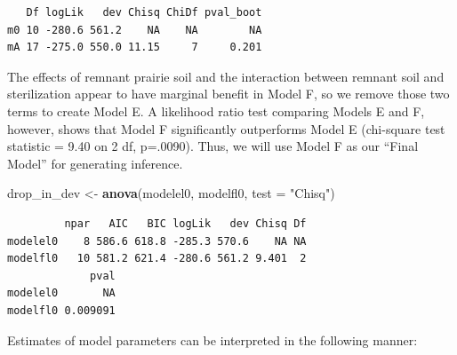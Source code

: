 \documentclass[
]{krantz}
\newenvironment{Shaded}{\begin{snugshade}}{\end{snugshade}}
\newcommand{\DataTypeTok}[1]{\textcolor[rgb]{0.27,0.27,0.27}{#1}}
\newcommand{\KeywordTok}[1]{\textcolor[rgb]{0.27,0.27,0.27}{\textbf{#1}}}
\newcommand{\NormalTok}[1]{#1}
\newcommand{\StringTok}[1]{\textcolor[rgb]{0.5,0.5,0.5}{#1}}
\begin{document}
\begin{verbatim}
   Df logLik   dev Chisq ChiDf pval_boot
m0 10 -280.6 561.2    NA    NA        NA
mA 17 -275.0 550.0 11.15     7     0.201
\end{verbatim}

The effects of remnant prairie soil and the interaction between remnant soil and sterilization appear to have marginal benefit in Model F, so we remove those two terms to create Model E. A likelihood ratio test comparing Models E and F, however, shows that Model F significantly outperforms Model E (chi-square test statistic = 9.40 on 2 df, p=.0090). Thus, we will use Model F as our ``Final Model'' for generating inference.

\begin{Shaded}
\begin{Highlighting}[]
\NormalTok{drop_in_dev <-}\StringTok{ }\KeywordTok{anova}\NormalTok{(modelel0, modelfl0, }\DataTypeTok{test =} \StringTok{"Chisq"}\NormalTok{)}
\end{Highlighting}
\end{Shaded}

\begin{verbatim}
         npar   AIC   BIC logLik   dev Chisq Df
modelel0    8 586.6 618.8 -285.3 570.6    NA NA
modelfl0   10 581.2 621.4 -280.6 561.2 9.401  2
             pval
modelel0       NA
modelfl0 0.009091
\end{verbatim}

Estimates of model parameters can be interpreted in the following manner:
\end{document}

